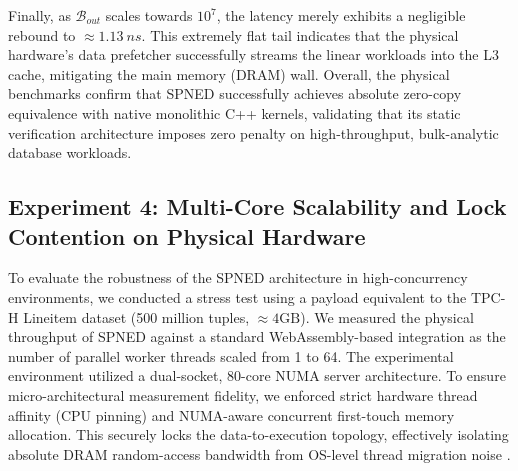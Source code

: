 \documentclass[onecolumn]{IEEEtran}
\numberwithin{equation}{section}
\theoremstyle{definition}
\theoremstyle{remark}
\begin{document}
Finally, as $\mathcal{B}_{out}$ scales towards $10^7$, the latency merely exhibits a negligible rebound to $\approx \SI{1.13}{ns}$. This extremely flat tail indicates that the physical hardware's data prefetcher successfully streams the linear workloads into the L3 cache, mitigating the main memory (DRAM) wall. Overall, the physical benchmarks confirm that SPNED successfully achieves absolute zero-copy equivalence with native monolithic C++ kernels, validating that its static verification architecture imposes zero penalty on high-throughput, bulk-analytic database workloads.






\subsection{Experiment 4: Multi-Core Scalability and Lock Contention on Physical Hardware}

To evaluate the robustness of the SPNED architecture in high-concurrency environments, we conducted a stress test using a payload equivalent to the TPC-H Lineitem dataset (500 million tuples, $\approx 4\text{GB}$). We measured the physical throughput of SPNED against a standard WebAssembly-based integration \cite{gienieczko2025anyblox} as the number of parallel worker threads scaled from 1 to 64. The experimental environment utilized a dual-socket, 80-core NUMA server architecture. To ensure micro-architectural measurement fidelity, we enforced strict hardware thread affinity (CPU pinning) and NUMA-aware concurrent first-touch memory allocation. This securely locks the data-to-execution topology, effectively isolating absolute DRAM random-access bandwidth from OS-level thread migration noise \cite{leis2014morsel}.
\end{document}
